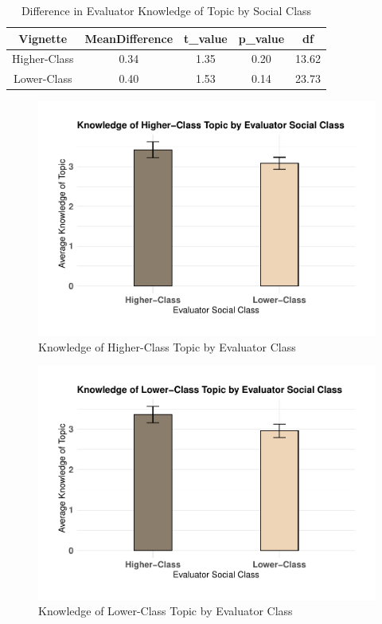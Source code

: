 \documentclass[
  man,floatsintext]{apa6}
\begin{document}
\begin{table}[!h]
\centering
\caption{\label{tab:t-test-evaluator}Difference in Evaluator Knowledge of Topic by Social Class}
\centering
\begin{tabular}[t]{ccccc}
\toprule
Vignette & MeanDifference & t\_value & p\_value & df\\
\midrule
Higher-Class & 0.34 & 1.35 & 0.20 & 13.62\\
Lower-Class & 0.40 & 1.53 & 0.14 & 23.73\\
\bottomrule
\end{tabular}
\end{table}

\begin{figure}
\centering
\includegraphics{sooyoun-pilot_files/figure-latex/bar-plot-high-1.pdf}
\caption{\label{fig:bar-plot-high}Knowledge of Higher-Class Topic by Evaluator Class}
\end{figure}

\begin{figure}
\centering
\includegraphics{sooyoun-pilot_files/figure-latex/bar-plot-low-1.pdf}
\caption{\label{fig:bar-plot-low}Knowledge of Lower-Class Topic by Evaluator Class}
\end{figure}
\end{document}
